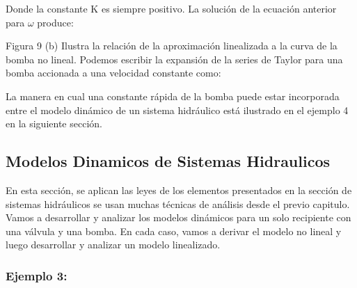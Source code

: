 \documentclass[a4paper,12pt,twoside]{proyectotanquesecci}
\begin{document}
\begin{equation}
\end{equation}

Donde la constante K es siempre positivo. La solución de la ecuación anterior para $\omega$ produce: \\

\begin{equation}
\end{equation}

Figura 9 (b) Ilustra la relación de la aproximación linealizada a la curva de la bomba no lineal. Podemos escribir la expansión de la series de Taylor para una bomba accionada a una velocidad constante como: \\

\begin{equation}
\end{equation}

La manera en cual una constante rápida de la bomba puede estar incorporada entre el modelo dinámico de un sistema hidráulico está ilustrado en el ejemplo 4 en la siguiente sección. \\

\subsection{Modelos Dinamicos de Sistemas Hidraulicos}

En esta sección, se aplican las leyes de los elementos presentados en la sección de sistemas hidráulicos se usan muchas técnicas de análisis  desde el previo capitulo. Vamos a desarrollar y analizar los modelos dinámicos para un solo recipiente con una válvula y una bomba. En cada caso, vamos a derivar el modelo no lineal y luego desarrollar y analizar un modelo linealizado. \\

\subsubsection{Ejemplo 3:}

\end{document}
